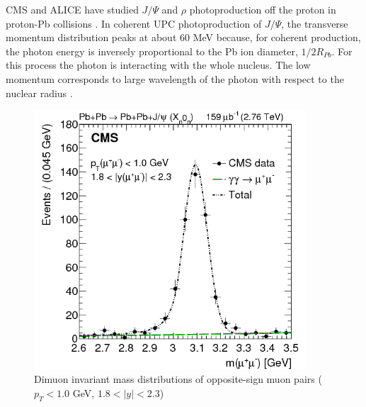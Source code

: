 CMS and ALICE have studied $J/\Psi$ and $\rho$ photoproduction off the proton in proton-Pb collisions \cite{TheALICE:2014dwa}. In coherent UPC photoproduction of $J/\Psi$, the transverse momentum distribution peaks at about 60 MeV because, for coherent production, the photon energy is inversely proportional to the Pb ion diameter, $1/2R_{Pb}$. For this process the photon is interacting with the whole nucleus. The low momentum corresponds to large wavelength of the photon with respect to the nuclear radius \cite{Guzey:2013taa}\cite{Frankfurt:2006wg}\cite{Baltz:2002pp}\cite{Klein:2003vd}. 
\begin{figure}[h!]
\begin{centering}
\includegraphics[width=4in]{Chapter2/importfigs/patkenny_Figure_001-a.png}
\par\end{centering}
\caption{Dimuon invariant mass distributions of opposite-sign muon pairs ($p_T<1.0$ GeV, $1.8<|y|<2.3$) \cite{Khachatryan:2016qhq}\label{fig:pk3}}
\end{figure}

